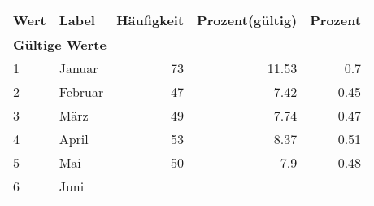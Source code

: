      \begin{longtable}{lXrrr}
     \toprule
     \textbf{Wert} & \textbf{Label} & \textbf{Häufigkeit} & \textbf{Prozent(gültig)} & \textbf{Prozent} \\
     \endhead
     \midrule
     \multicolumn{5}{l}{\textbf{Gültige Werte}}\\

     1 &
     \multicolumn{1}{X}{ Januar   } &


       \num{73} &
       \num[round-mode=places,round-precision=2]{11,53} &
         \num[round-mode=places,round-precision=2]{0,7} \\

     2 &
     \multicolumn{1}{X}{ Februar   } &


       \num{47} &
       \num[round-mode=places,round-precision=2]{7,42} &
         \num[round-mode=places,round-precision=2]{0,45} \\

     3 &
     \multicolumn{1}{X}{ März   } &


       \num{49} &
       \num[round-mode=places,round-precision=2]{7,74} &
         \num[round-mode=places,round-precision=2]{0,47} \\

     4 &
     \multicolumn{1}{X}{ April   } &


       \num{53} &
       \num[round-mode=places,round-precision=2]{8,37} &
         \num[round-mode=places,round-precision=2]{0,51} \\

     5 &
     \multicolumn{1}{X}{ Mai   } &


       \num{50} &
       \num[round-mode=places,round-precision=2]{7,9} &
         \num[round-mode=places,round-precision=2]{0,48} \\

     6 &
     \multicolumn{1}{X}{ Juni   } &



\end{longtable}
